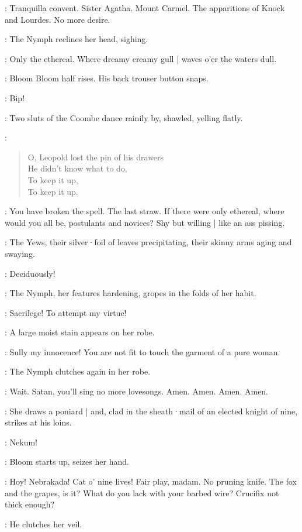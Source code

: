 \Nymph:
Tranquilla convent.
Sister Agatha.
Mount Carmel.
The apparitions of Knock and Lourdes.
No more desire.

:
The Nymph reclines her head,
sighing.

\Nymph:
Only the ethereal.
Where dreamy creamy gull |
waves o'er the waters dull.

:
Bloom Bloom half rises.
His back trouser button snaps.

\Button:
Bip!

:
Two sluts of the Coombe dance rainily by,
shawled,
yelling flatly.

\Sluts:
\begin{verse}
    O, Leopold lost the pin of his drawers\\
    He didn't know what to do,\\
    To keep it up,\\
    To keep it up.
\end{verse}

\Bloom:
You have broken the spell.
The last straw.
If there were only ethereal,
where would you all be,
postulants and novices?
%
Shy but willing |
like an ass pissing.

:
The Yews,
their silver·foil of leaves precipitating,
their skinny arms aging and swaying.

\Yews:
Deciduously!

:
The Nymph,
her features hardening,
gropes in the folds of her habit.

\Nymph:
Sacrilege!
To attempt my virtue!

:
A large moist stain appears on her robe.

\Nymph:
Sully my innocence!
You are not fit to touch the garment of a pure woman.

:
The Nymph clutches again in her robe.

\Nymph:
Wait.
Satan,
you'll sing no more lovesongs.
Amen.
Amen.
Amen.
Amen.

:
She draws a poniard |
and,
clad in the sheath·mail of an elected knight of nine,
strikes at his loins.

\Nymph:
Nekum!

:
Bloom starts up,
seizes her hand.

\Bloom:
Hoy!
Nebrakada!
Cat o' nine lives!
Fair play,
madam.
No pruning knife.
The fox and the grapes,
is it?
What do you lack with your barbed wire?
Crucifix not thick enough?

:
He clutches her veil.

